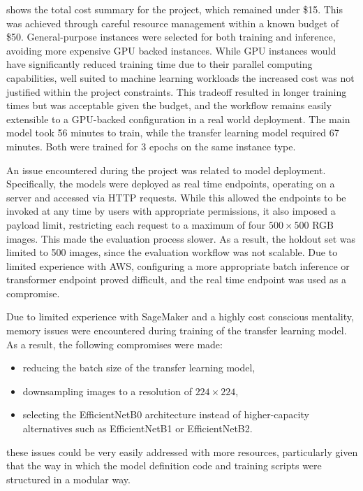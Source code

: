  shows the total cost summary for the project, which remained under \$15. This was achieved through careful resource management within a known budget of \$50. General-purpose  instances were selected for both training and inference, avoiding more expensive GPU backed instances. While GPU instances would have significantly reduced training time due to their parallel computing capabilities, well suited to machine learning workloads the increased cost was not justified within the project constraints. This tradeoff resulted in longer training times but was acceptable given the budget, and the workflow remains easily extensible to a GPU-backed configuration in a real world deployment. The main model took 56 minutes to train, while the transfer learning model required 67 minutes. Both were trained for 3 epochs on the same  instance type.

An issue encountered during the project was related to model deployment. Specifically, the models were deployed as real time endpoints, operating on a server and accessed via HTTP requests. While this allowed the endpoints to be invoked at any time by users with appropriate permissions, it also imposed a payload limit, restricting each request to a maximum of four $500 \times 500$ RGB images. This made the evaluation process slower. As a result, the holdout set was limited to 500 images, since the evaluation workflow was not scalable. Due to limited experience with AWS, configuring a more appropriate batch inference or transformer endpoint proved difficult, and the real time endpoint was used as a compromise.

Due to limited experience with SageMaker and a highly cost conscious mentality, memory issues were encountered during training of the transfer learning model. As a result, the following compromises were made:
\begin{itemize}
    \item reducing the batch size of the transfer learning model,
    \item downsampling images to a resolution of $224 \times 224$,
    \item selecting the EfficientNetB0 architecture instead of higher-capacity alternatives such as EfficientNetB1 or EfficientNetB2.
\end{itemize}
these issues could be very easily addressed with more resources, particularly given that the way in which the model definition code and training scripts were structured in a modular way.


